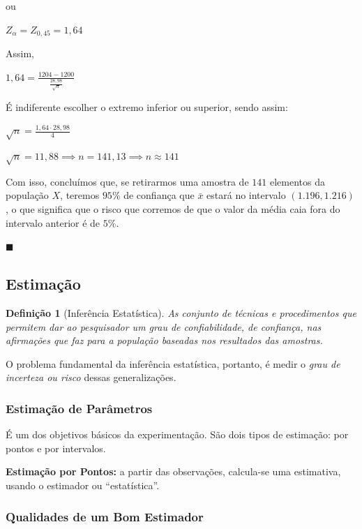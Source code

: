 \documentclass[oneside,a4paper,12pt]{article}
\newtheorem{definition}{Definição}[section]
\begin{document}
ou

$Z_{\alpha} = Z_{0,45} = 1,64$

Assim,

$1,64 = \displaystyle \frac{1204 - 1200}{\frac{28,98}{\sqrt{n}}}$

É indiferente escolher o extremo inferior ou superior, sendo assim:

$\displaystyle \sqrt{n} = \frac{1,64 \cdot 28,98}{4}$

$\displaystyle \sqrt{n} = 11,88 \implies n = 141,13 \implies n \approx 141$

Com isso, concluímos que, se retirarmos uma amostra de $141$ elementos da população $X$, teremos $95\%$ de confiança que $\bar{x}$ estará no intervalo $(1.196,1.216)$, o que significa que o risco que corremos de que o valor da média caia fora do intervalo anterior é de $5\%$.
\begin{flushright}
	$\blacksquare$
\end{flushright}

\subsection{Estimação}

\begin{definition}[Inferência Estatística]
	As conjunto de técnicas e procedimentos que permitem dar ao pesquisador um grau de confiabilidade, de confiança, nas afirmações que faz para a população baseadas nos resultados das amostras.
\end{definition}

O problema fundamental da inferência estatística, portanto, é medir o \emph{grau de incerteza ou risco} dessas generalizações.

\subsubsection{Estimação de Parâmetros}

É um dos objetivos básicos da experimentação. São dois tipos de estimação: por pontos e por intervalos.

{\bf Estimação por Pontos:} a partir das observações, calcula-se uma estimativa, usando o estimador ou ``estatística''.

\subsubsection{Qualidades de um Bom Estimador}
\end{document}
